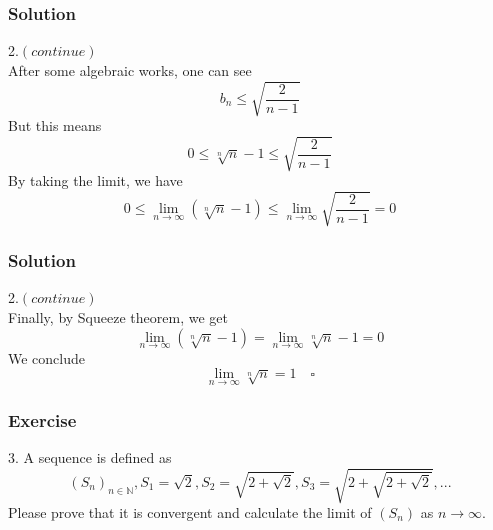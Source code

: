 \documentclass{beamer}
\begin{document}
    \begin{frame}
        \frametitle{Solution}
    2.$(continue)$\\
    \hspace{1em} After some algebraic works, one can see 
    \begin{equation*}
        b_n\leq\sqrt{\frac{2}{n-1}}
    \end{equation*}
    \hspace{1em} But this means 
    \begin{equation*}
        0\leq \sqrt[n]{n}-1\leq \sqrt{\frac{2}{n-1}}
    \end{equation*}
    \hspace{1em} By taking the limit, we have
    \begin{equation*}
        0\leq \lim_{n\rightarrow\infty}(\sqrt[n]{n}-1)\leq \lim_{n\rightarrow\infty}\sqrt{\frac{2}{n-1}}=0
    \end{equation*}
    \end{frame}
    
    \begin{frame}
        \frametitle{Solution}
    2.$(continue)$\\
    \hspace{1em} Finally, by Squeeze theorem, we get 
    \begin{equation*}
        \lim_{n\rightarrow\infty}(\sqrt[n]{n}-1)=\lim_{n\rightarrow\infty}\sqrt[n]{n}-1=0
    \end{equation*}
    \hspace{1em} We conclude
    \begin{equation*}
        \lim_{n\rightarrow\infty}\sqrt[n]{n}=1\quad\square
    \end{equation*}
    \end{frame}



    \begin{frame}
        \frametitle{Exercise}
        3. A sequence is defined as
        \begin{equation*}
            (S_n)_{n\in\mathbb{N}}, S_1=\sqrt{2}, S_2=\sqrt{2+\sqrt{2}}, S_3=\sqrt{2+\sqrt{2+\sqrt{2}}},...
        \end{equation*}
        Please prove that it is convergent and calculate the limit of $(S_n)$ as $n\rightarrow \infty$.
    \end{frame}
    
\end{document}
